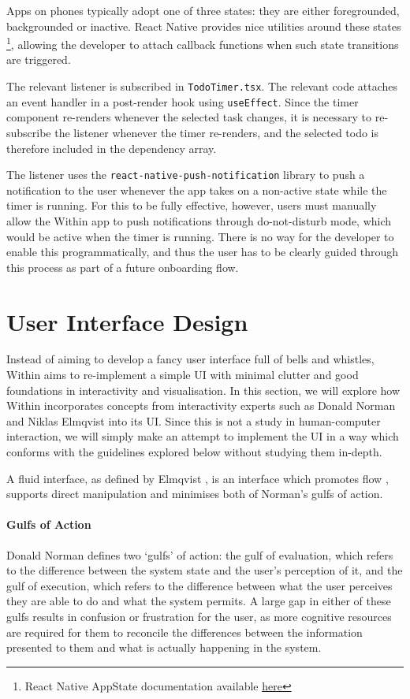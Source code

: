 Apps on phones typically adopt one of three states: they are either foregrounded, backgrounded or inactive. React Native provides nice utilities around these states \footnote{React Native AppState documentation available \href{https://reactnative.dev/docs/next/appstate}{here}}, allowing the developer to attach callback functions when such state transitions are triggered.

The relevant listener is subscribed in \texttt{TodoTimer.tsx}. The relevant code attaches an event handler in a post-render hook using \texttt{useEffect}. Since the timer component re-renders whenever the selected task changes, it is necessary to re-subscribe the listener whenever the timer re-renders, and the selected todo is therefore included in the dependency array.

The listener uses the \texttt{react-native-push-notification} library to push a notification to the user whenever the app takes on a non-active state while the timer is running. For this to be fully effective, however, users must manually allow the Within app to push notifications through do-not-disturb mode, which would be active when the timer is running. There is no way for the developer to enable this programmatically, and thus the user has to be clearly guided through this process as part of a future onboarding flow.

\section{User Interface Design}
Instead of aiming to develop a fancy user interface full of bells and whistles, Within aims to re-implement a simple UI with minimal clutter and good foundations in interactivity and visualisation. In this section, we will explore how Within incorporates concepts from interactivity experts such as Donald Norman and Niklas Elmqvist into its UI. Since this is not a study in human-computer interaction, we will simply make an attempt to implement the UI in a way which conforms with the guidelines explored below without studying them in-depth.

A fluid interface, as defined by Elmqvist \cite{elmqvist2011fluid}, is an interface which promotes flow \cite{csikszentmihalyi1990flow}, supports direct manipulation\cite{shneiderman19931} and minimises both of Norman's \cite{norman1986user} gulfs of action.

\paragraph{Gulfs of Action} Donald Norman defines two `gulfs' of action: the gulf of evaluation, which refers to the difference between the system state and the user's perception of it, and the gulf of execution, which refers to the difference between what the user perceives they are able to do and what the system permits. A large gap in either of these gulfs results in confusion or frustration for the user, as more cognitive resources are required for them to reconcile the differences between the information presented to them and what is actually happening in the system.

